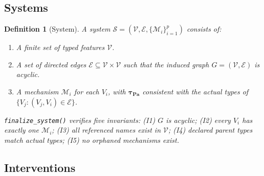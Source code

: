 \documentclass[12pt,a4paper]{article}
\newcommand{\fct}[1]{\mbox{\texttt{#1()}}}
\newtheorem{definition}{Definition}[section]
\begin{document}
\subsection{Systems}
\label{sec:system_def}

\begin{definition}[System]
\label{def:system}
A \emph{system} $\mathcal{S} = (\mathcal{V}, \mathcal{E}, \{\mathcal{M}_i\}_{i=1}^p)$
consists of:
\begin{enumerate}[nosep,leftmargin=2em]
  \item A finite set of typed features $\mathcal{V}$.
  \item A set of directed edges $\mathcal{E} \subseteq \mathcal{V}\times\mathcal{V}$
        such that the induced graph $G = (\mathcal{V}, \mathcal{E})$ is acyclic.
  \item A mechanism $\mathcal{M}_i$ for each $V_i$, with
        $\boldsymbol\tau_{\mathbf{Pa}}$ consistent with the actual types of
        $\{V_j : (V_j,V_i)\in\mathcal{E}\}$.
\end{enumerate}
\fct{finalize\_system} verifies five invariants: (I1) $G$ is acyclic; (I2) every
$V_i$ has exactly one $\mathcal{M}_i$; (I3) all referenced names exist in
$\mathcal{V}$; (I4) declared parent types match actual types; (I5) no orphaned
mechanisms exist.
\end{definition}

\subsection{Interventions}
\label{sec:intervention_def}
\end{document}
